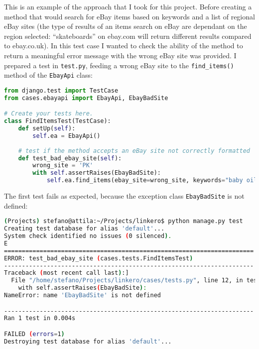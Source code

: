 This is an example of the approach that I took for this project. Before
creating a method that would search for eBay items based on keywords and
a list of regional eBay sites (the type of results of an items search on eBay
are dependant on the region selected: ``skateboards'' on ebay.com will return
different results compared to ebay.co.uk). In this test case I wanted to check
the ability of the method to return a meaningful error message with the wrong
eBay site was provided. I prepared a test in \texttt{test.py}, feeding a wrong
eBay site to the \texttt{find\_items()} method of the \texttt{EbayApi} class:
\begin{lstlisting}[language=Python, breaklines=true]
from django.test import TestCase
from cases.ebayapi import EbayApi, EbayBadSite

# Create your tests here.
class FindItemsTest(TestCase):
    def setUp(self):
        self.ea = EbayApi()
    
    # test if the method accepts an eBay site not correctly formatted
    def test_bad_ebay_site(self):
        wrong_site = 'PK'
        with self.assertRaises(EbayBadSite):
            self.ea.find_items(ebay_site=wrong_site, keywords="baby oil")
\end{lstlisting}

The first test fails as expected, because the exception class
\texttt{EbayBadSite} is not defined:
\begin{lstlisting}[language=bash, breaklines=true]
(Projects) stefano@attila:~/Projects/linkero$ python manage.py test
Creating test database for alias 'default'...
System check identified no issues (0 silenced).
E
======================================================================
ERROR: test_bad_ebay_site (cases.tests.FindItemsTest)
----------------------------------------------------------------------
Traceback (most recent call last):]
  File "/home/stefano/Projects/linkero/cases/tests.py", line 12, in test_bad_ebay_site
    with self.assertRaises(EbayBadSite):
NameError: name 'EbayBadSite' is not defined

----------------------------------------------------------------------
Ran 1 test in 0.004s

FAILED (errors=1)
Destroying test database for alias 'default'...
\end{lstlisting}

